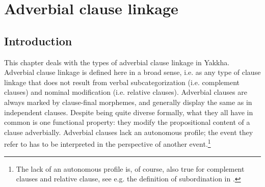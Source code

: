 ﻿

\chapter{Adverbial clause linkage}\label{adv-cl}


\section{Introduction}

This chapter deals with the types of adverbial clause linkage in Yakkha. Adverbial clause linkage is defined here in a broad sense, i.e. as any type of clause linkage that does not result from verbal subcategorization (i.e. complement clauses) and nominal modification (i.e. relative clauses). Adverbial clauses are always marked by clause-final morphemes, and generally display the same  as in independent clauses. 
Despite being quite diverse formally, what they all have in common is one functional property: they modify the propositional content of a clause adverbially. Adverbial clauses lack an autonomous profile; the event they refer to has to be interpreted in the perspective of another event.\footnote{The lack of an autonomous profile is, of course, also true for complement clauses and relative clause, see e.g. the definition of subordination in \citet{Cristofaro2003Subordination}.}


